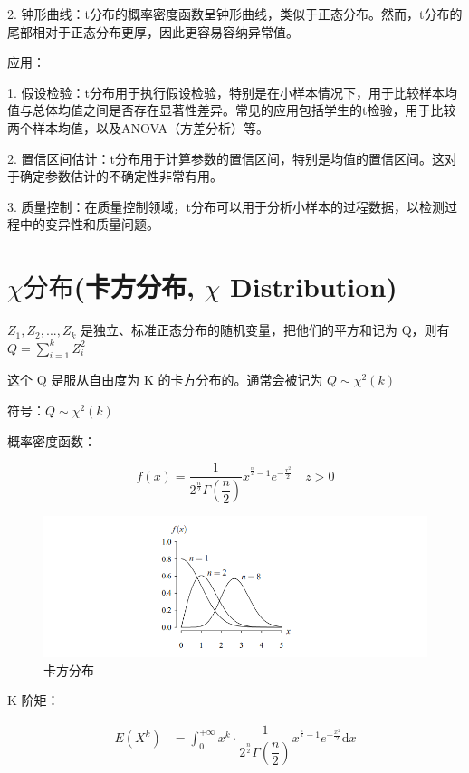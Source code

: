 \documentclass[12pt, a4paper, oneside]{ctexbook}
\begin{document}
2. 钟形曲线：t分布的概率密度函数呈钟形曲线，类似于正态分布。然而，t分布的尾部相对于正态分布更厚，因此更容易容纳异常值。

 应用：

1. 假设检验：t分布用于执行假设检验，特别是在小样本情况下，用于比较样本均值与总体均值之间是否存在显著性差异。常见的应用包括学生的t检验，用于比较两个样本均值，以及ANOVA（方差分析）等。

2. 置信区间估计：t分布用于计算参数的置信区间，特别是均值的置信区间。这对于确定参数估计的不确定性非常有用。

3. 质量控制：在质量控制领域，t分布可以用于分析小样本的过程数据，以检测过程中的变异性和质量问题。

\section{$\chi 分布$(卡方分布, $\chi$ Distribution)}

$Z_1, Z_2, ..., Z_k$ 是独立、标准正态分布的随机变量，把他们的平方和记为 Q，则有 $Q = \sum\limits_{i = 1}^{k} Z_i^{2}$

这个 Q 是服从自由度为 K 的卡方分布的。通常会被记为 $Q \sim \chi^{2}(k)$

 符号：$Q \sim \chi^{2}(k)$

 概率密度函数：

$$
f(x) = \dfrac{1}{2^{\frac{n}{2}}\Gamma(\dfrac{n}{2})}x^{^{\frac{n}{2}} - 1}e^{-\frac{x^{2}}{2}} \quad z > 0
$$

\begin{figure}[H]
  \centering
  \includegraphics[width=1\textwidth]{image/卡方分布.png}
  \caption{卡方分布}
  \label{fig:example}
\end{figure}

 K 阶矩：

$$
\begin{aligned}
E(X^{k}) &= \int_0^{+\infty} x^{k} \cdot \dfrac{1}{2^{\frac{n}{2}}\Gamma(\dfrac{n}{2})}x^{^{\frac{n}{2}} - 1}e^{-\frac{x^{2}}{2}} \mathrm{d}x \\
\end{aligned}
$$
\end{document}
